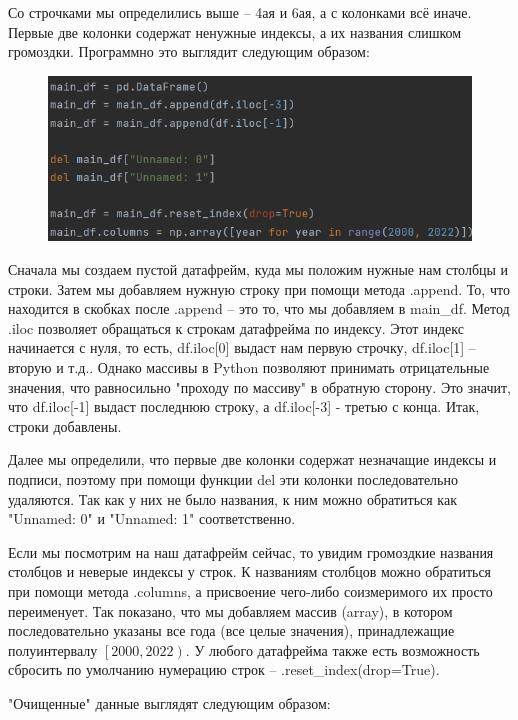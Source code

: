 Со строчками мы определились выше -- 4ая и 6ая, а с колонками всё иначе. Первые две колонки содержат ненужные индексы, а их названия слишком громоздки. Программно это выглядит следующим образом:

\begin{figure}[H]
	\begin{center}
		\includegraphics{include/fig/maindf}
	\end{center}
\end{figure}

Сначала мы создаем пустой датафрейм, куда мы положим нужные нам столбцы и строки. Затем мы добавляем нужную строку при помощи метода .append. То, что находится в скобках после .append -- это то, что мы добавляем в main\_df. Метод .iloc позволяет обращаться к строкам датафрейма по индексу. Этот индекс начинается с нуля, то есть, df.iloc[0] выдаст нам первую строчку, df.iloc[1] -- вторую и т.д.. Однако массивы в Python позволяют принимать отрицательные значения, что равносильно "проходу по массиву" в обратную сторону. Это значит, что df.iloc[-1] выдаст последнюю строку, а df.iloc[-3] - третью с конца. Итак, строки добавлены.

Далее мы определили, что первые две колонки содержат незначащие индексы и подписи, поэтому при помощи функции del эти колонки последовательно удаляются. Так как у них не было названия, к ним можно обратиться как "Unnamed: 0" и "Unnamed: 1" соответственно.

Если мы посмотрим на наш датафрейм сейчас, то увидим громоздкие названия столбцов и неверые индексы у строк. К названиям столбцов можно обратиться при помощи метода .columns, а присвоение чего-либо соизмеримого их просто переименует. Так показано, что мы добавляем массив (array), в котором последовательно указаны все года (все целые значения), принадлежащие полуинтервалу $\left[2000, 2022\right)$. У любого датафрейма также есть возможность сбросить по умолчанию нумерацию строк -- .reset\_index(drop=True).

"Очищенные" данные выглядят следующим образом:

